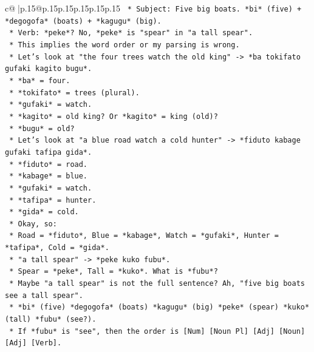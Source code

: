 \documentclass{article}
\begin{document}
{\begin{supertabular}{c@{$\;$}|p{.15\linewidth}@{}p{.15\linewidth}p{.15\linewidth}p{.15\linewidth}p{.15\linewidth}p{.15\linewidth}}
{{{\texttt{                *   Subject: Five big boats. *bi* (five) + *degogofa* (boats) + *kagugu* (big).} \\
\texttt{                *   Verb: *peke*? No, *peke* is "spear" in "a tall spear".} \\
\texttt{                *   This implies the word order or my parsing is wrong.} \\
\texttt{            *   Let's look at "the four trees watch the old king" {-}> *ba tokifato gufaki kagito bugu*.} \\
\texttt{                *   *ba* = four.} \\
\texttt{                *   *tokifato* = trees (plural).} \\
\texttt{                *   *gufaki* = watch.} \\
\texttt{                *   *kagito* = old king? Or *kagito* = king (old)?} \\
\texttt{                *   *bugu* = old?} \\
\texttt{            *   Let's look at "a blue road watch a cold hunter" {-}> *fiduto kabage gufaki tafipa gida*.} \\
\texttt{                *   *fiduto* = road.} \\
\texttt{                *   *kabage* = blue.} \\
\texttt{                *   *gufaki* = watch.} \\
\texttt{                *   *tafipa* = hunter.} \\
\texttt{                *   *gida* = cold.} \\
\texttt{            *   Okay, so:} \\
\texttt{                *   Road = *fiduto*, Blue = *kabage*, Watch = *gufaki*, Hunter = *tafipa*, Cold = *gida*.} \\
\texttt{                *   "a tall spear" {-}> *peke kuko fubu*.} \\
\texttt{                    *   Spear = *peke*, Tall = *kuko*. What is *fubu*?} \\
\texttt{                    *   Maybe "a tall spear" is not the full sentence? Ah, "five big boats see a tall spear".} \\
\texttt{                    *   *bi* (five) *degogofa* (boats) *kagugu* (big) *peke* (spear) *kuko* (tall) *fubu* (see?).} \\
\texttt{                    *   If *fubu* is "see", then the order is {[}Num{]} {[}Noun Pl{]} {[}Adj{]} {[}Noun{]} {[}Adj{]} {[}Verb{]}.} \\
}}}
\end{supertabular}}
\end{document}
